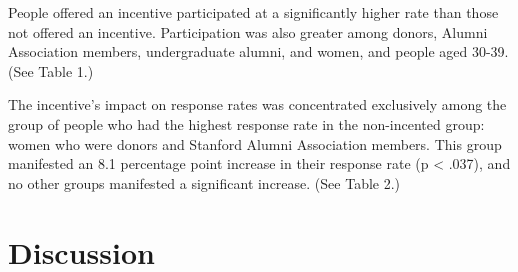 \documentclass[12pt]{article}
\begin{document}
People offered an incentive participated at a significantly higher rate than those not offered an incentive.  Participation was also greater among donors, Alumni Association members, undergraduate alumni, and women, and people aged 30-39.  (See Table 1.)

The incentive's impact on response rates was concentrated exclusively among the group of people who had the highest response rate in the non-incented group: women who were donors and Stanford Alumni Association members.  This group manifested an 8.1 percentage point increase in their response rate (p < .037), and no other groups manifested a significant increase.  (See Table 2.)

\section{Discussion}
\end{document}
